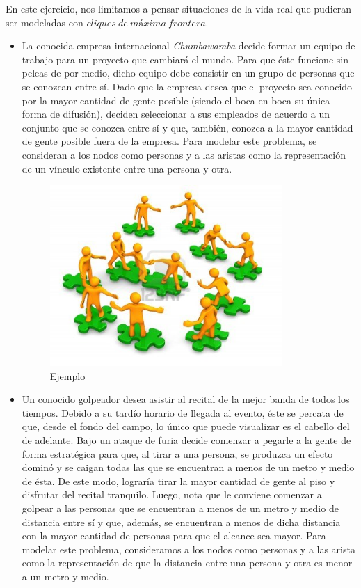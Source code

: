 En este ejercicio, nos limitamos a pensar situaciones de la vida real que pudieran ser modeladas con $cliques\ de\ máxima\ frontera$.
\begin{itemize}

\item La conocida empresa internacional \textit{Chumbawamba} decide formar un equipo de trabajo para un proyecto que cambiará el mundo. Para que éste funcione sin peleas de por medio, dicho equipo debe consistir en un grupo de personas que se conozcan entre sí. Dado que la empresa desea que el proyecto sea conocido por la mayor cantidad de gente posible (siendo el boca en boca su única forma de difusión), deciden seleccionar a sus empleados de acuerdo a un conjunto que se conozca entre sí y que, también, conozca a la mayor cantidad de gente posible fuera de la empresa. Para modelar este problema, se consideran a los nodos como personas y a las aristas como la representación de un vínculo existente entre una persona y otra.
\begin{figure}[H] %
\begin{center}
\includegraphics[width=250pt]{../imgs/ej1ejemp1.jpg}
\caption{Ejemplo}
\end{center}
\end{figure}

\item Un conocido golpeador desea asistir al recital de la mejor banda de todos los tiempos. Debido a su tardío horario de llegada al evento, éste se percata de que, desde el fondo del campo, lo único que puede visualizar es el cabello del de adelante. Bajo un ataque de furia decide comenzar a pegarle a la gente de forma estratégica para que, al tirar a una persona, se produzca un efecto dominó y se caigan todas las que se encuentran a menos de un metro y medio de ésta. De este modo, lograría tirar la mayor cantidad de gente al piso y disfrutar del recital tranquilo. Luego, nota que le conviene comenzar a golpear a las personas que se encuentran a menos de un metro y medio de distancia entre sí y que, además, se encuentran a menos de dicha distancia con la mayor cantidad de personas para que el alcance sea mayor. Para modelar este problema, consideramos a los nodos como personas y a las arista como la representación de que la distancia entre una persona y otra es menor a un metro y medio.  


\end{itemize}
